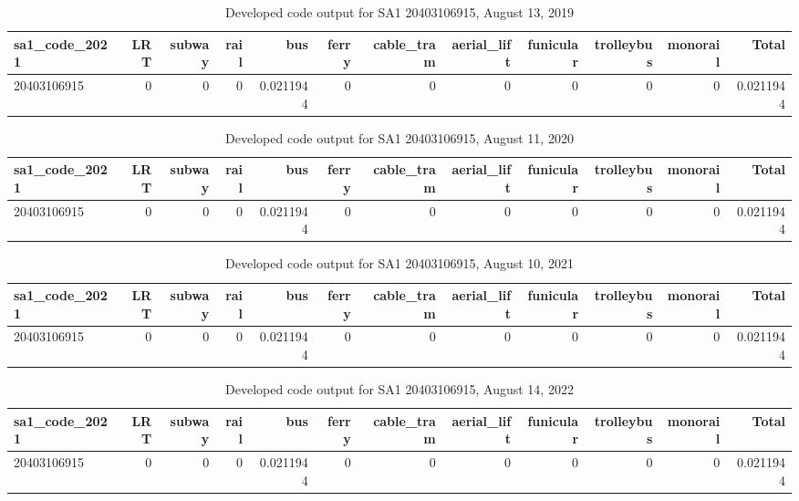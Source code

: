 \documentclass[]{tufte-book}
\begin{document}
\begin{table}

\caption{\label{tab:Running_Creek_SI_calc_SA1_2018_2022}Developed code output for SA1 20403106915, August 13, 2019}
\centering
\begin{tabular}[t]{l|r|r|r|r|r|r|r|r|r|r|r}
\hline
sa1\_code\_2021 & LRT & subway & rail & bus & ferry & cable\_tram & aerial\_lift & funicular & trolleybus & monorail & Total\\
\hline
20403106915 & 0 & 0 & 0 & 0.0211944 & 0 & 0 & 0 & 0 & 0 & 0 & 0.0211944\\
\hline
\end{tabular}
\end{table}

\begin{table}

\caption{\label{tab:Running_Creek_SI_calc_SA1_2018_2022}Developed code output for SA1 20403106915, August 11, 2020}
\centering
\begin{tabular}[t]{l|r|r|r|r|r|r|r|r|r|r|r}
\hline
sa1\_code\_2021 & LRT & subway & rail & bus & ferry & cable\_tram & aerial\_lift & funicular & trolleybus & monorail & Total\\
\hline
20403106915 & 0 & 0 & 0 & 0.0211944 & 0 & 0 & 0 & 0 & 0 & 0 & 0.0211944\\
\hline
\end{tabular}
\end{table}

\begin{table}

\caption{\label{tab:Running_Creek_SI_calc_SA1_2018_2022}Developed code output for SA1 20403106915, August 10, 2021}
\centering
\begin{tabular}[t]{l|r|r|r|r|r|r|r|r|r|r|r}
\hline
sa1\_code\_2021 & LRT & subway & rail & bus & ferry & cable\_tram & aerial\_lift & funicular & trolleybus & monorail & Total\\
\hline
20403106915 & 0 & 0 & 0 & 0.0211944 & 0 & 0 & 0 & 0 & 0 & 0 & 0.0211944\\
\hline
\end{tabular}
\end{table}

\begin{table}

\caption{\label{tab:Running_Creek_SI_calc_SA1_2018_2022}Developed code output for SA1 20403106915, August 14, 2022}
\centering
\begin{tabular}[t]{l|r|r|r|r|r|r|r|r|r|r|r}
\hline
sa1\_code\_2021 & LRT & subway & rail & bus & ferry & cable\_tram & aerial\_lift & funicular & trolleybus & monorail & Total\\
\hline
20403106915 & 0 & 0 & 0 & 0.0211944 & 0 & 0 & 0 & 0 & 0 & 0 & 0.0211944\\
\hline
\end{tabular}
\end{table}
\end{document}
